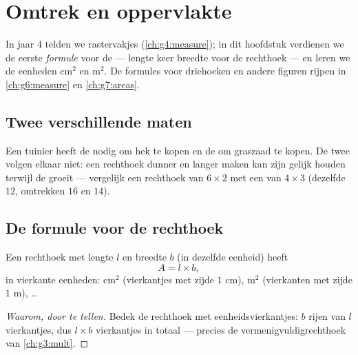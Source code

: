\chapter{Omtrek en oppervlakte}\label{ch:g5:areas}

In jaar 4 telden we rastervakjes (\cref{ch:g4:measure}); in dit hoofdstuk
verdienen we de eerste \emph{formule} voor de  --- lengte keer
breedte voor de rechthoek --- en leren we de eenheden cm$^2$ en m$^2$. De
formules voor driehoeken en andere figuren rijpen in \cref{ch:g6:measure} en
\cref{ch:g7:areas}.

\section{Twee verschillende maten}

\begin{example}\label{ex:g5:areas:contrast}
Een tuinier heeft de \emph{} nodig om hek te kopen en de
\emph{} om graszaad te kopen. De twee volgen elkaar niet: een
rechthoek dunner en langer maken kan zijn  gelijk houden terwijl de
 groeit --- vergelijk een rechthoek van $6 \times 2$ met een van
$4 \times 3$ (dezelfde  $12$, omtrekken $16$ en $14$).
\end{example}

\section{De formule voor de rechthoek}

\begin{proposition}\label{prop:g5:areas:rectangle}
Een rechthoek met lengte $l$ en breedte $b$ (in dezelfde eenheid) heeft
\[
A = l \times b ,
\]
in vierkante eenheden: cm$^2$ (vierkantjes met zijde $1$ cm), m$^2$
(vierkanten met zijde $1$ m), \dots
\end{proposition}

\begin{proof}[Waarom, door te tellen]
Bedek de rechthoek met eenheidsvierkantjes: $b$ rijen van $l$ vierkantjes,
dus $l \times b$ vierkantjes in totaal --- precies de
vermenigvuldigrechthoek van \cref{ch:g3:mult}.
\end{proof}

